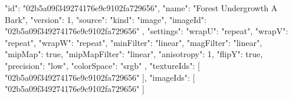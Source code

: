 {
  "id": "02b5a09f349274176e9c9102fa729656",
  "name": "Forest Undergrowth A Bark",
  "version": 1,
  "source": {
    "kind": "image",
    "imageId": "02b5a09f349274176e9c9102fa729656"
  },
  "settings": {
    "wrapU": "repeat",
    "wrapV": "repeat",
    "wrapW": "repeat",
    "minFilter": "linear",
    "magFilter": "linear",
    "mipMap": true,
    "mipMapFilter": "linear",
    "anisotropy": 1,
    "flipY": true,
    "precision": "low",
    "colorSpace": "srgb"
  },
  "textureIds": [
    "02b5a09f349274176e9c9102fa729656"
  ],
  "imageIds": [
    "02b5a09f349274176e9c9102fa729656"
  ]
}
